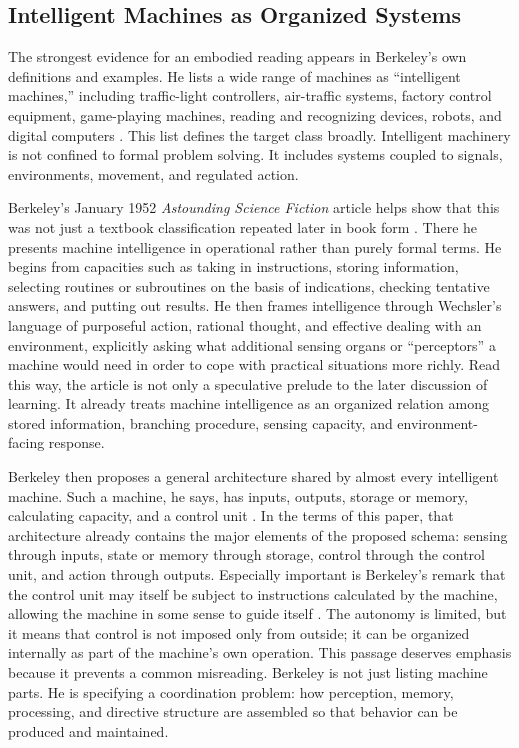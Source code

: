 \documentclass[11pt]{article}
\begin{document}
\subsection*{Intelligent Machines as Organized Systems}

The strongest evidence for an embodied reading appears in Berkeley's own definitions and examples. He lists a wide range of machines as ``intelligent machines,'' including traffic-light controllers, air-traffic systems, factory control equipment, game-playing machines, reading and recognizing devices, robots, and digital computers \citep[pp.~66--69]{berkeley1959symbolic}. This list defines the target class broadly. Intelligent machinery is not confined to formal problem solving. It includes systems coupled to signals, environments, movement, and regulated action.

Berkeley's January 1952 \emph{Astounding Science Fiction} article helps show that this was not just a textbook classification repeated later in book form \citep{berkeley1952machineintelligence}. There he presents machine intelligence in operational rather than purely formal terms. He begins from capacities such as taking in instructions, storing information, selecting routines or subroutines on the basis of indications, checking tentative answers, and putting out results. He then frames intelligence through Wechsler's language of purposeful action, rational thought, and effective dealing with an environment, explicitly asking what additional sensing organs or ``perceptors'' a machine would need in order to cope with practical situations more richly. Read this way, the article is not only a speculative prelude to the later discussion of learning. It already treats machine intelligence as an organized relation among stored information, branching procedure, sensing capacity, and environment-facing response.

Berkeley then proposes a general architecture shared by almost every intelligent machine. Such a machine, he says, has inputs, outputs, storage or memory, calculating capacity, and a control unit \citep[p.~70]{berkeley1959symbolic}. In the terms of this paper, that architecture already contains the major elements of the proposed schema: sensing through inputs, state or memory through storage, control through the control unit, and action through outputs. Especially important is Berkeley's remark that the control unit may itself be subject to instructions calculated by the machine, allowing the machine in some sense to guide itself \citep[p.~70]{berkeley1959symbolic}. The autonomy is limited, but it means that control is not imposed only from outside; it can be organized internally as part of the machine's own operation. This passage deserves emphasis because it prevents a common misreading. Berkeley is not just listing machine parts. He is specifying a coordination problem: how perception, memory, processing, and directive structure are assembled so that behavior can be produced and maintained.
\end{document}
